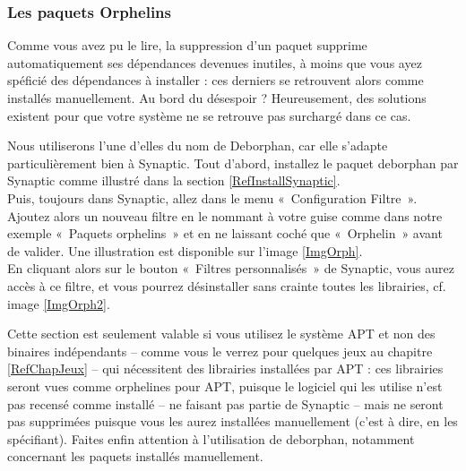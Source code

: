 \subsubsection{Les paquets Orphelins}
Comme vous avez pu le lire, la suppression d'un paquet supprime automatiquement ses dépendances devenues inutiles, à moins que vous ayez spéficié des dépendances à installer : ces derniers se retrouvent alors comme installés manuellement. Au bord du désespoir ? Heureusement, des solutions existent pour que votre système ne se retrouve pas surchargé dans ce cas.\par
Nous utiliserons l'une d'elles du nom de Deborphan, car elle s'adapte particulièrement bien à Synaptic. Tout d'abord, installez le paquet deborphan par Synaptic comme illustré dans la section \ref{RefInstallSynaptic}.\\
Puis, toujours dans Synaptic, allez dans le menu «~Configuration \FlecheDroite Filtre~». Ajoutez alors un nouveau filtre en le nommant à votre guise comme dans notre exemple «~Paquets orphelins~» et en ne laissant coché que «~Orphelin~» avant de valider. Une illustration est disponible sur l'image \ref{ImgOrph}.\\
En cliquant alors sur le bouton «~Filtres personnalisés~» de Synaptic, vous aurez accès à ce filtre, et vous pourrez désinstaller sans crainte toutes les librairies, cf. image \ref{ImgOrph2}.\par
{}
\begin{nota}
Cette section est seulement valable si vous utilisez le système APT et non des binaires indépendants -- comme vous le verrez pour quelques jeux au chapitre \ref{RefChapJeux} -- qui nécessitent des librairies installées par APT : ces librairies seront vues comme orphelines pour APT, puisque le logiciel qui les utilise n'est pas recensé comme installé -- ne faisant pas partie de Synaptic -- mais ne seront pas supprimées puisque vous les aurez installées manuellement (c'est à dire, en les spécifiant). Faites enfin attention à l'utilisation de deborphan, notamment concernant les paquets installés manuellement.
\end{nota}
